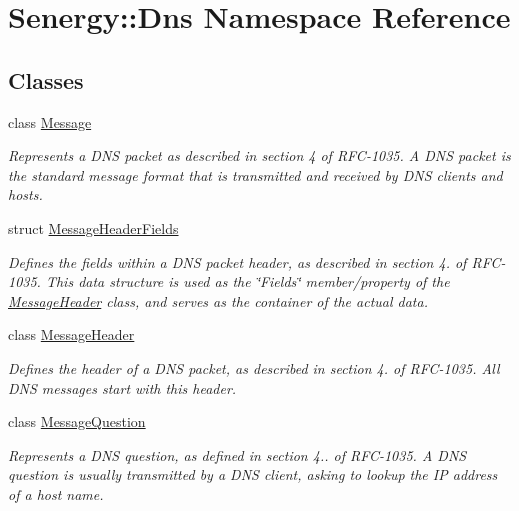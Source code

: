 \hypertarget{namespace_senergy_1_1_dns}{\section{Senergy\-:\-:Dns Namespace Reference}
\label{namespace_senergy_1_1_dns}
}
\subsection*{Classes}
\begin{DoxyCompactItemize}
\item 
class \hyperlink{class_senergy_1_1_dns_1_1_message}{Message}
\begin{DoxyCompactList}\small\item\em Represents a D\-N\-S packet as described in section 4 of R\-F\-C-\/1035. A D\-N\-S packet is the standard message format that is transmitted and received by D\-N\-S clients and hosts. \end{DoxyCompactList}\item 
struct \hyperlink{struct_senergy_1_1_dns_1_1_message_header_fields}{Message\-Header\-Fields}
\begin{DoxyCompactList}\small\item\em Defines the fields within a D\-N\-S packet header, as described in section 4. of R\-F\-C-\/1035. This data structure is used as the \char`\"{}\-Fields\char`\"{} member/property of the \hyperlink{class_senergy_1_1_dns_1_1_message_header}{Message\-Header} class, and serves as the container of the actual data. \end{DoxyCompactList}\item 
class \hyperlink{class_senergy_1_1_dns_1_1_message_header}{Message\-Header}
\begin{DoxyCompactList}\small\item\em Defines the header of a D\-N\-S packet, as described in section 4. of R\-F\-C-\/1035. All D\-N\-S messages start with this header. \end{DoxyCompactList}\item 
class \hyperlink{class_senergy_1_1_dns_1_1_message_question}{Message\-Question}
\begin{DoxyCompactList}\small\item\em Represents a D\-N\-S question, as defined in section 4.. of R\-F\-C-\/1035. A D\-N\-S question is usually transmitted by a D\-N\-S client, asking to lookup the I\-P address of a host name. \end{DoxyCompactList}\item 

\end{DoxyCompactItemize}
